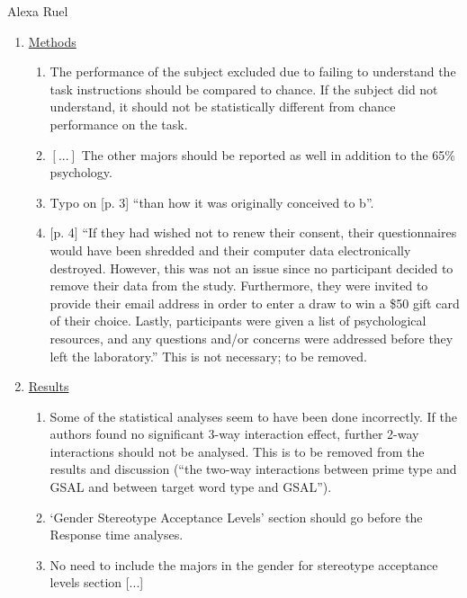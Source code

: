 \documentclass[authordate, serif, review]{jote-article}
\begin{document}
\begin{multicols}{2}
\begin{reviewend}{ Alexa Ruel}
\begin{enumerate}[label=\textbf{\arabic*}), start=0]
    \item \hyperref[sec:methods]{Methods}
        \begin{enumerate}
            \item The performance of the subject excluded due to failing to understand the task instructions should be compared to chance. If the subject did not understand, it should not be statistically different from chance performance on the task.

            \item $[...]$ The other majors should be reported as well in addition to the 65\% psychology. 

            \item Typo on [p. 3] ``than how it was originally conceived to b''.
            
            \item $[$p. 4$]$  ``If they had wished not to renew their consent, their questionnaires would have been shredded and their computer data electronically destroyed. However, this was not an issue since no participant decided to remove their data from the study. Furthermore, they were invited to provide their email address in order to enter a draw to win a \$50 gift card of their choice. Lastly, participants were given a list of psychological resources, and any questions and/or concerns were addressed before they left the laboratory.'' This is not necessary; to be removed.
            
        \end{enumerate}

    \item \hyperref[sec:results]{Results}
        \begin{enumerate}
            \item Some of the statistical analyses seem to have been done incorrectly. If the authors found no significant 3-way interaction effect, further 2-way interactions should not be analysed. This is to be removed from the results and discussion (``the two-way interactions between prime type and GSAL and between target word type and GSAL'').
            \item `Gender Stereotype Acceptance Levels' section should go before the Response time analyses. 
            \item No need to include the majors in the gender for stereotype acceptance levels section [...]
        \end{enumerate}
        

\end{enumerate}
\end{reviewend}
\end{multicols}
\end{document}

